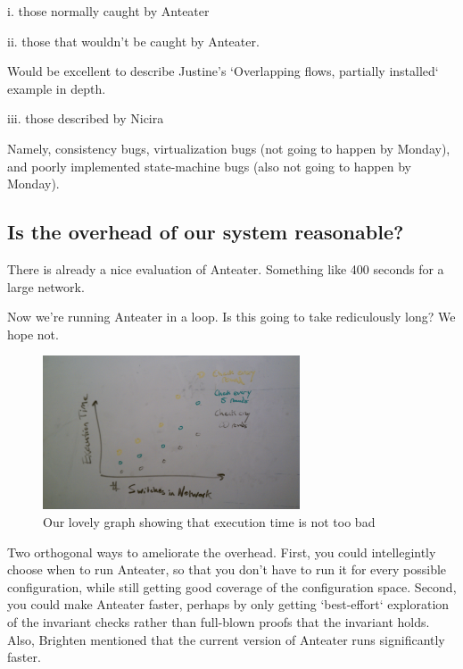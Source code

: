 i. those normally caught by Anteater 

ii. those that wouldn't be caught by Anteater.

Would be excellent to describe Justine's `Overlapping flows, partially
installed` example in depth.

iii. those described by Nicira

Namely, consistency bugs, virtualization bugs (not going to happen by Monday),
and poorly implemented state-machine bugs (also not going to happen by
Monday).


\subsection{Is the overhead of our system reasonable?}

There is already a nice evaluation of Anteater. Something like 400 seconds for
a large network.

Now we're running Anteater in a
loop. Is this going to take rediculously long? We hope not.

\begin{figure}[t]
    \centering
    \includegraphics[width=3in]{../graphs/mock_overhead_graph.jpg}
    \caption[]{\label{fig:loop} Our lovely graph showing that execution time
    is not too bad\vspace{-10pt}} 
\end{figure}

Two orthogonal ways to ameliorate the overhead. First, you could intellegintly choose
when to run Anteater, so that you don't have to run it for every possible
configuration, while still getting good coverage of the
configuration space. Second, you could make Anteater faster, perhaps by only
getting `best-effort` exploration of the invariant checks rather than
full-blown proofs that the invariant holds. Also, Brighten mentioned that the
current version of Anteater runs significantly faster.
